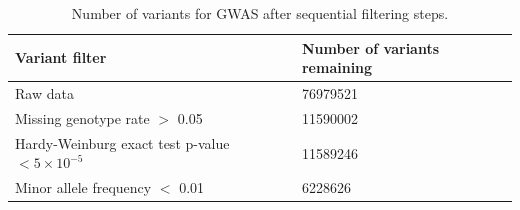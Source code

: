 \documentclass[11pt]{article}
\begin{document}
\begin{table}[H]
\caption{Number of variants for GWAS after sequential filtering steps.}
	\begin{tabularx}{\linewidth}{XX}
	\hline
	Variant filter & Number of variants remaining \\
	\hline 
	Raw data & 76979521 \\
	Missing genotype rate $>$ 0.05 & 11590002 \\
	Hardy-Weinburg exact test p-value $< 5 \times 10^{-5}$ & 11589246 \\
	Minor allele frequency $<$ 0.01 & 6228626 \\ \hline			
	\end{tabularx}
	\label{tab:variant-filtering}
\end{table}

\stopsection
\end{document}
